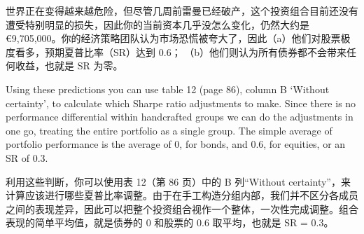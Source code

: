 \begin{chineseblock}世界正在变得越来越危险，但尽管几周前雷曼已经破产，这个投资组合目前还没有遭受特别明显的损失，因此你的当前资本几乎没怎么变化，仍然大约是 €9,705,000。你的经济策略团队认为市场恐慌被夸大了，因此（a）他们对股票极度看多，预期夏普比率（SR）达到 0.6； （b）他们则认为所有债券都不会带来任何收益，也就是 SR 为零。\end{chineseblock}

\bipairgap

\begin{englishblock} Using these predictions you can use table 12 (page 86), column B ‘Without certainty', to calculate which Sharpe ratio adjustments to make. Since there is no performance differential within handcrafted groups we can do the adjustments in one go, treating the entire portfolio as a single group. The simple average of portfolio performance is the average of 0, for bonds, and 0.6, for equities, or an SR of 0.3. \end{englishblock}

\begin{chineseblock}利用这些判断，你可以使用表 12（第 86 页）中的 B 列“Without certainty”，来计算应该进行哪些夏普比率调整。由于在手工构造分组内部，我们并不区分各成员之间的表现差异，因此可以把整个投资组合视作一个整体，一次性完成调整。组合表现的简单平均值，就是债券的 0 和股票的 0.6 取平均，也就是 SR = 0.3。 \end{chineseblock}


\begin{chinesetableblock} 
\end{chinesetableblock}

